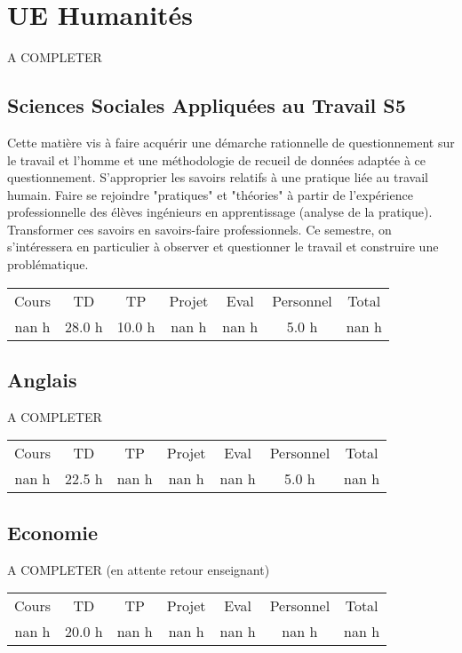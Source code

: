 \section{UE Humanités}%
\label{sec:UEHumanits}%
A COMPLETER%
\subsection{Sciences Sociales Appliquées au Travail S5}%
\label{subsec:SciencesSocialesAppliquesauTravailS5}%

%
Cette matière vis à faire acquérir une démarche rationnelle de questionnement sur le travail et l'homme et une méthodologie de recueil de données adaptée à ce questionnement. S'approprier les savoirs relatifs à une pratique liée au travail humain. Faire se rejoindre "pratiques" et "théories" à partir de l'expérience professionnelle des élèves ingénieurs en apprentissage (analyse de la pratique). Transformer ces savoirs en savoirs{-}faire professionnels. Ce semestre, on s'intéressera en particulier à observer et questionner le travail et construire une problématique.%
\begin{longtable}{c c c c c c c}%
\hline%
Cours&TD&TP&Projet&Eval&Personnel&Total\\%
nan h&28.0 h&10.0 h&nan h&nan h&5.0 h&nan h\\%
\hline%
\end{longtable}%
\subsection{Anglais}%
\label{subsec:Anglais}%

%
A COMPLETER%
\begin{longtable}{c c c c c c c}%
\hline%
Cours&TD&TP&Projet&Eval&Personnel&Total\\%
nan h&22.5 h&nan h&nan h&nan h&5.0 h&nan h\\%
\hline%
\end{longtable}%
\subsection{Economie}%
\label{subsec:Economie}%

%
A COMPLETER (en attente retour enseignant)%
\begin{longtable}{c c c c c c c}%
\hline%
Cours&TD&TP&Projet&Eval&Personnel&Total\\%
nan h&20.0 h&nan h&nan h&nan h&nan h&nan h\\%
\hline%
\end{longtable}%
